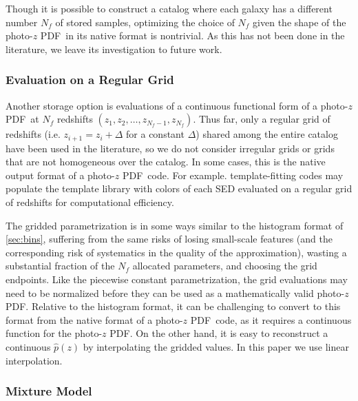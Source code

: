 \documentclass[\docopts]{\docclass}
\newcommand{\pz}{photo-$z$ PDF}
\begin{document}
Though it is possible to construct a catalog where each galaxy has a different 
number $N_{f}$ of stored samples, optimizing the choice of $N_{f}$ given the 
shape of the \pz\ in its native format is nontrivial.  As this has not been 
done in the literature, we leave its investigation to future work.

\subsubsection{Evaluation on a Regular Grid}
\label{sec:grid}


Another storage option is evaluations of a continuous functional form of a \pz\ 
at $N_{f}$ redshifts $(z_{1}, z_{2}, \dots, z_{N_{f}-1}, z_{N_{f}})$.  Thus 
far, only a regular grid of redshifts (i.e. $z_{i+1}=z_{i}+\Delta$ for a 
constant $\Delta$) shared among the entire catalog have been used in the 
literature, so we do not consider irregular grids or grids that are not 
homogeneous over the catalog.   In some cases, this is the native output format 
of a \pz\ code.  For example. template-fitting codes may populate the template 
library with colors of each SED evaluated on a regular grid of redshifts for 
computational efficiency.

The gridded parametrization is in some ways similar to the histogram format of 
\ref{sec:bins}, suffering from the same risks of losing small-scale features 
(and the corresponding risk of systematics in the quality of the 
approximation), wasting a substantial fraction of the $N_{f}$ allocated 
parameters, and choosing the grid endpoints.  Like the piecewise constant 
parametrization, the grid evaluations may need to be normalized before they can 
be used as a mathematically valid \pz.  Relative to the histogram format, it 
can be challenging to convert to this format from the native format of a \pz\ 
code, as it requires a continuous function for the \pz.  On the other hand, it 
is easy to reconstruct a continuous $\hat{p}(z)$ by interpolating the gridded 
values.  In this paper we use linear interpolation.  \COMMENT{Expand on this.}

\subsubsection{Mixture Model}
\label{sec:mm}

\end{document}
